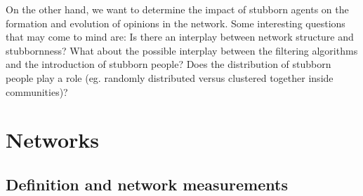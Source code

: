 \documentclass[11 pt , letterpaper , twoside , openright]{book}
\begin{document}
\newline
On the other hand, we want to determine the impact of stubborn agents on the formation and evolution of opinions in the network. Some interesting questions that may come to mind are: Is there an interplay between network structure and stubbornness? What about the possible interplay between the filtering algorithms and the introduction of stubborn people? Does the distribution of stubborn people play a role (eg. randomly distributed versus clustered together inside communities)? \\




\chapter{Networks}
\label{chap2}



\section{Definition and network measurements}
\label{netDef}
\end{document}
